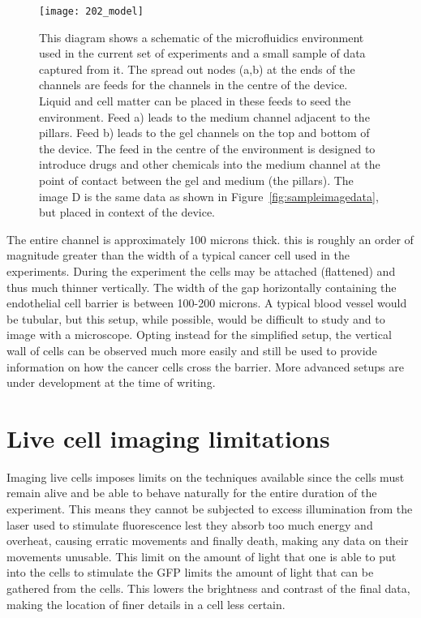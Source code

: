 \begin{figure}[h!]
 \centering
 \texttt{[image: 202\_model]}
 \caption[Microfludics device and data in context]{
 	This diagram shows a schematic of the microfluidics environment used in the current set of experiments and a small sample of data captured from it. The spread out nodes (a,b) at the ends of the channels are feeds for the channels in the centre of the device. Liquid and cell matter can be placed in these feeds to seed the environment. Feed a) leads to the medium channel adjacent to the pillars. Feed b) leads to the gel channels on the top and bottom of the device. The feed in the centre of the environment is designed to introduce drugs and other chemicals into the medium channel at the point of contact between the gel and medium (the pillars). The image D is the same data as shown in Figure~\ref{fig:sampleimagedata}, but placed in context of the device.
 }
 \label{fig:model}
\end{figure}

The entire channel is approximately 100 microns thick. this is roughly an order of magnitude greater than the width of a typical cancer cell used in the experiments. During the experiment the cells may be attached (flattened) and thus much thinner vertically. The width of the gap horizontally containing the endothelial cell barrier is between 100-200 microns. A typical blood vessel would be tubular, but this setup, while possible, would be difficult to study and to image with a microscope. Opting instead for the simplified setup, the vertical wall of cells can be observed much more easily and still be used to provide information on how the cancer cells cross the barrier. More advanced setups are under development at the time of writing.

\section{Live cell imaging limitations}

Imaging live cells imposes limits on the techniques available since the cells must remain alive and be able to behave naturally for the entire duration of the experiment. This means they cannot be subjected to excess illumination from the laser used to stimulate fluorescence lest they absorb too much energy and overheat, causing erratic movements and finally death, making any data on their movements unusable. This limit on the amount of light that one is able to put into the cells to stimulate the GFP limits the amount of light that can be gathered from the cells. This lowers the brightness and contrast of the final data, making the location of finer details in a cell less certain.

